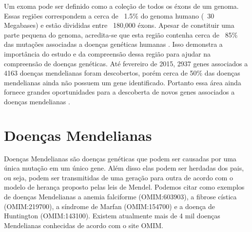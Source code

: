 
Um exoma pode ser definido como a coleção de todos os éxons de um genoma. Essas  regiões correspondem a cerca de ~1.5\% do genoma humano (~30 Megabases) e estão divididas entre ~180,000 éxons. Apesar de constituir uma parte pequena do genoma, acredita-se que esta região contenha cerca de ~85\% das mutações associadas a doenças genéticas humanas \cite{Choi2009}. Isso demonstra a importância do estudo e da compreensão dessa região para ajudar na compreensão de doenças genéticas. Até fevereiro de 2015, 2937 genes associados a 4163 doenças mendelianas foram descobertos, porém cerca de 50\% das doenças mendelianas ainda não possuem um gene identificado. Portanto essa área ainda fornece grandes oportunidades para a descoberta de novos genes associados a doenças mendelianas \cite{Chong2015}. 


\section{Doenças Mendelianas}

Doenças Mendelianas são doenças genéticas que podem ser causadas por uma única mutação em um único gene. Além disso elas podem ser herdadas dos pais, ou seja, podem ser transmitidas de uma geração para outra de acordo com o modelo de herança proposto pelas leis de Mendel. Podemos citar como exemplos de doenças Mendelianas a anemia falciforme (OMIM:603903), a fibrose cística (OMIM:219700), a síndrome de Marfan (OMIM:154700) e a doença de Huntington (OMIM:143100). Existem atualmente mais de 4 mil doenças Mendelianas conhecidas de acordo com o site OMIM.

